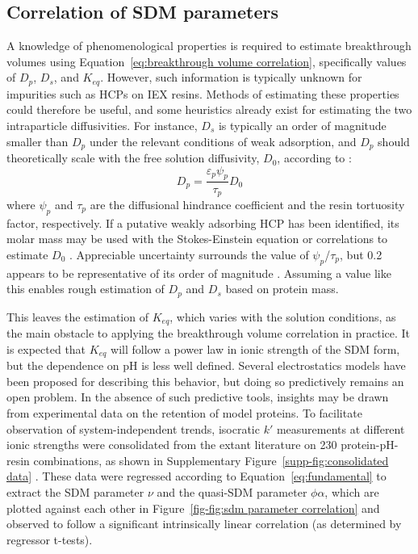 \documentclass[preprint,review,12pt]{elsarticle}
\providecommand{\DIFaddtex}[1]{\protect\cbstart{#1}\protect\cbend} %
\providecommand{\DIFaddbegin}{} %
\providecommand{\DIFaddend}{} %
\providecommand{\DIFadd}[1]{\texorpdfstring{\DIFaddtex{#1}}{#1}} %
\begin{document}
    \subsection{Correlation of SDM parameters} \label{ssec:thermo corr}

        A knowledge of phenomenological properties is required to estimate breakthrough volumes using Equation~\ref{eq:breakthrough volume correlation}, specifically values of $D_p$, $D_s$, and $K_{eq}$. However, such information is typically unknown for impurities such as HCPs on IEX resins. Methods of estimating these properties could therefore be useful, and some heuristics already exist for estimating the two intraparticle diffusivities. For instance, $D_s$ is typically an order of magnitude smaller than $D_p$ under the relevant conditions of weak adsorption, and $D_p$ should theoretically scale with the free solution diffusivity, $D_0$, according to \cite{Carta2010a}:
        \begin{equation} \label{eq:tortuosity relationship}
            D_p = \frac{\varepsilon_p \psi_p}{\tau_p} D_0
        \end{equation}
        where $\psi_p$ and $\tau_p$ are the diffusional hindrance coefficient and the resin tortuosity factor, respectively. If a putative weakly adsorbing HCP has been identified, its molar mass may be used with the Stokes-Einstein equation or correlations to estimate $D_0$ \cite{Young1980}. Appreciable uncertainty surrounds the value of $\psi_p$/$\tau_p$, but 0.2 appears to be representative of its order of magnitude \cite{Angelo2016b}. Assuming a value like this enables rough estimation of $D_p$ and $D_s$ based on protein mass.



        This leaves the estimation of $K_{eq}$, which varies with the solution conditions, as the main obstacle to applying the breakthrough volume correlation in practice. It is expected that $K_{eq}$ will follow a power law in ionic strength of the SDM form, but the dependence on pH is less well defined. Several electrostatics models have been proposed for describing this behavior, but doing so predictively remains an open problem. In the absence of such predictive tools, insights may be drawn from experimental data on the retention of model proteins. To facilitate observation of system-independent trends, isocratic $k'$ measurements at different ionic strengths were consolidated from the extant literature on 230 protein-pH-resin combinations, as shown in Supplementary Figure~\ref{supp-fig:consolidated data} \DIFaddbegin \DIFadd{and the accompanying spreadsheet }\DIFaddend \cite{Staby2000, Staby2001, Staby2004, Staby2005, Staby2006, Staby2007, DePhillips2001, DePhillips2004, Kumar2015, bai1999}. These data were regressed according to Equation~\ref{eq:fundamental} to extract the SDM parameter $\nu$ and the quasi-SDM parameter $\phi \alpha$, which are plotted against each other in Figure~\ref{fig-fig:sdm parameter correlation} and observed to follow a significant intrinsically linear correlation (as determined by regressor t-tests).
\end{document}
